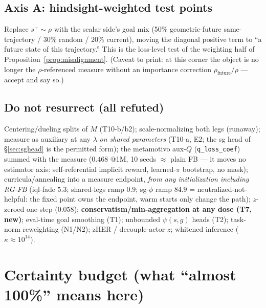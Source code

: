 \documentclass[11pt]{article}
\theoremstyle{definition}
\theoremstyle{remark}
\begin{document}
\subsection{Axis A: hindsight-weighted test points}
Replace $s^+\sim\rho$ with the scalar side's goal mix (50\% geometric-future
same-trajectory / 30\% random / 20\% current), moving the diagonal positive term to ``a
future state of this trajectory.'' This is the loss-level test of the weighting half of
Proposition~\ref{prop:misalignment}. (Caveat to print: at this corner the object is no
longer the $\rho$-referenced measure without an importance correction $\rho_{\mathrm{future}}/\rho$
--- accept and say so.)

\subsection{Do not resurrect (all refuted)}
Centering/dueling splits of $M$ (T10-b/b2); scale-normalizing both legs (runaway); measure as
auxiliary at any $\lambda$ \emph{on shared parameters} (T10-a, E2; the sg head of
\S\ref{sec:sghead} is the permitted form); the metamotivo aux-$Q$ (\texttt{q\_loss\_coef})
summed with the measure ($0.468$ @1M, 10 seeds $\approx$ plain FB --- it moves no estimator
axis: self-referential implicit reward, learned-$\pi$ bootstrap, no mask);
curricula/annealing into a measure endpoint, \emph{from any initialization including RG-FB}
(iql-fade $5.3$; shared-legs ramp $0.9$; sg-$\phi$ ramp $84.9$ = neutralized-not-helpful:
the fixed point owns the endpoint, warm starts only change the path); $z$-zeroed one-step
($0.058$); \textbf{conservatism/min-aggregation at any dose (T7, new)}; eval-time goal
smoothing (T1); unbounded $\psi(s,g)$ heads (T2); task-norm reweighting (N1/N2); zHER /
decouple-actor-$z$; whitened inference ($\kappa\approx10^{14}$).

\section{Certainty budget (what ``almost 100\%'' means here)}\label{sec:certainty}
\end{document}
